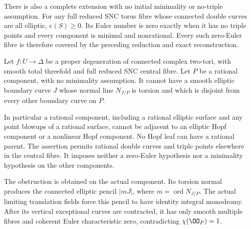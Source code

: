 \begin{proposition}
There is also a complete extension with no initial minimality
or no-triple assumption. For any full reduced SNC torus fibre
whose connected double curves are all elliptic, $e(S)\ge0$.
Its Euler number is zero exactly when it has no triple
points and every component is minimal and nonrational.
Every such zero-Euler fibre is therefore covered by the
preceding reduction and exact reconstruction.
\end{proposition}

\begin{proposition}\label{cdp:st:C.2.UN.67}

Let \(f:U\to\Delta\) be a proper degeneration of connected
complex two-tori, with smooth total threefold and full
reduced SNC central fibre. Let \(P\) be a rational
component, with no minimality assumption. It cannot
have a smooth elliptic boundary curve \(J\) whose normal
line \(N_{J/P}\) is torsion and which is disjoint from
every other boundary curve on \(P\).

In particular a rational component, including a rational
elliptic surface and any point blowups of a rational
surface, cannot be adjacent to an elliptic Hopf component
or a nonlinear Hopf component. No Hopf leaf can have a
rational parent. The assertion permits rational double
curves and triple points elsewhere in the central fibre.
It imposes neither a zero-Euler hypothesis nor a
minimality hypothesis on the other components.

The obstruction is obtained on the actual component.
Its torsion normal produces the connected elliptic
pencil \(|mJ|\), where \(m=\operatorname{ord}N_{J/P}\).
The actual limiting translation fields force this
pencil to have identity integral monodromy. After its
vertical exceptional curves are contracted, it has
only smooth multiple fibres and coherent Euler
characteristic zero, contradicting
\(\chi(\OO_P)=1\).
\end{proposition}

